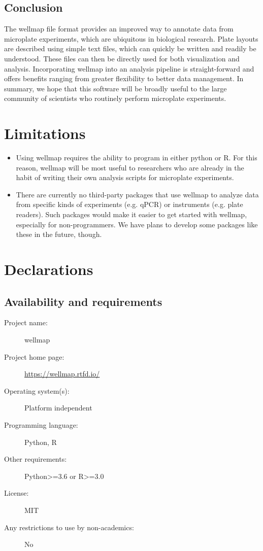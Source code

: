 \documentclass{bmcart}
\begin{document}
\subsection*{Conclusion}

The wellmap file format provides an improved way to annotate data from microplate experiments, which are ubiquitous in biological research. Plate layouts are described using simple text files, which can quickly be written and readily be understood. These files can then be directly used for both visualization and analysis. Incorporating wellmap into an analysis pipeline is straight-forward and offers benefits ranging from greater flexibility to better data management. In summary, we hope that this software will be broadly useful to the large community of scientists who routinely perform microplate experiments.

\section*{Limitations}

\begin{itemize}

\item Using wellmap requires the ability to program in either python or R. For this reason, wellmap will be most useful to researchers who are already in the habit of writing their own analysis scripts for microplate experiments.

\item There are currently no third-party packages that use wellmap to analyze data from specific kinds of experiments (e.g. qPCR) or instruments (e.g. plate readers). Such packages would make it easier to get started with wellmap, especially for non-programmers. We have plans to develop some packages like these in the future, though.

\end{itemize}

\section*{Declarations}

\subsection*{Availability and requirements}
\begin{description}
\item [Project name:] wellmap
\item [Project home page:] \url{https://wellmap.rtfd.io/}
\item [Operating system(s):] Platform independent
\item [Programming language:] Python, R
\item [Other requirements:] Python\textgreater=3.6 or R\textgreater=3.0
\item [License:] MIT
\item [Any restrictions to use by non-academics:] No
\end{description}
\end{document}
